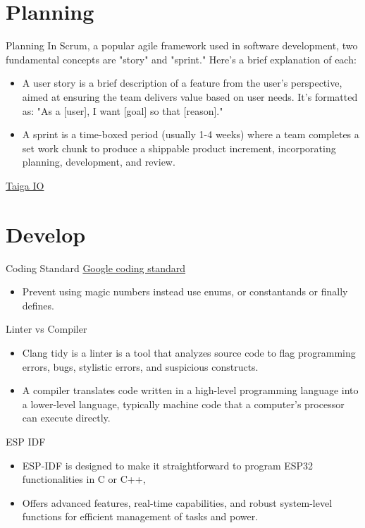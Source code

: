 \documentclass[10pt]{beamer}
\begin{document}
\section{Planning}
\begin{frame} {Planning}
  In Scrum, a popular agile framework used in software development, two fundamental concepts are "story" and "sprint." Here's a brief explanation of each:
  \begin{itemize}
    \item A user story is a brief description of a feature from the user's perspective, aimed at ensuring the team delivers value based on user needs. It’s formatted as: "As a [user], I want [goal] so that [reason]."
    \item A sprint is a time-boxed period (usually 1-4 weeks) where a team completes a set work chunk to produce a shippable product increment, incorporating planning, development, and review.
  \end{itemize}

  \href{Taiga.io}{Taiga IO}
\end{frame}

\section{Develop}

\begin{frame} {Coding Standard}
  \href{https://google.github.io/styleguide/cppguide.html}{Google coding standard}
  \begin{itemize}
    \item Prevent using magic numbers instead use enums, or constantands or finally defines.
  \end{itemize}
\end{frame}

\begin{frame} {Linter vs Compiler}
  \begin{itemize}
    \item Clang tidy is a linter is a tool that analyzes source code to flag programming errors, bugs, stylistic errors, and suspicious constructs.
    \item A compiler translates code written in a high-level programming language into a lower-level language, typically machine code that a computer's processor can execute directly.
  \end{itemize}
\end{frame}

\begin{frame} {ESP IDF}
    \begin{itemize}
      \item  ESP-IDF is designed to make it straightforward to program ESP32 functionalities in C or C++, 
      \item Offers advanced features, real-time capabilities, and robust system-level functions for efficient management of tasks and power.
    \end{itemize}
\end{frame}
\end{document}
